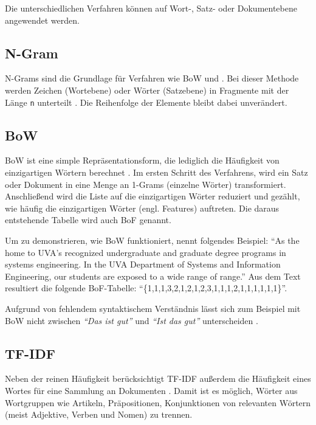 Die unterschiedlichen Verfahren können auf Wort-, Satz- oder Dokumentebene angewendet werden.

\subsection*{N-Gram}

N-Grams sind die Grundlage für Verfahren wie \ac{BoW} und \ft. Bei dieser Methode werden Zeichen (Wortebene) oder Wörter (Satzebene) in Fragmente mit der Länge \texttt{n} unterteilt \autocite[5]{kowsari_text_2019}. Die Reihenfolge der Elemente bleibt dabei unverändert.

\subsection*{\acl{BoW}}

\ac{BoW} ist eine simple Repräsentationsform, die lediglich die Häufigkeit von einzigartigen Wörtern berechnet \autocite[6]{kowsari_text_2019}. Im ersten Schritt des Verfahrens, wird ein Satz oder Dokument in eine Menge an 1-Grams (einzelne Wörter) transformiert. Anschließend wird die Liste auf die einzigartigen Wörter reduziert und gezählt, wie häufig die einzigartigen Wörter (engl. Features) auftreten. Die daraus entstehende Tabelle wird auch \ac{BoF} genannt.

Um zu demonstrieren, wie \ac{BoW} funktioniert, nennt \textcite[6]{kowsari_text_2019} folgendes Beispiel: \enquote{As the home to UVA’s recognized undergraduate and graduate degree programs in systems engineering. In the UVA Department of Systems and Information Engineering, our students are exposed to a wide range of range.} Aus dem Text resultiert die folgende \ac{BoF}-Tabelle: \enquote{\{1,1,1,3,2,1,2,1,2,3,1,1,1,2,1,1,1,1,1,1\}}.

Aufgrund von fehlendem syntaktischem Verständnis lässt sich zum Beispiel mit \ac{BoW} nicht zwischen \textit{\enquote{Das ist gut}} und \textit{\enquote{Ist das gut}} unterscheiden \autocite[6]{kowsari_text_2019}.

\subsection*{\acl{TF-IDF}}

Neben der reinen Häufigkeit berücksichtigt \ac{TF-IDF} außerdem die Häufigkeit eines Wortes für eine Sammlung an Dokumenten \autocite[7]{kowsari_text_2019}. Damit ist es möglich, Wörter aus Wortgruppen wie Artikeln, Präpositionen, Konjunktionen von relevanten Wörtern (meist Adjektive, Verben und Nomen) zu trennen.

